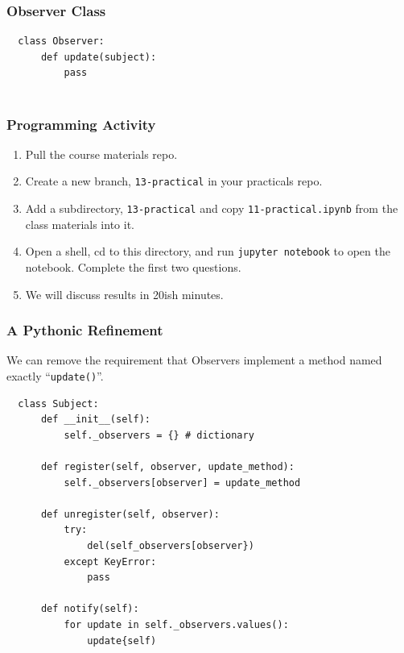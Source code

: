 \documentclass[10pt]{beamer}
\begin{document}
\begin{frame}[fragile]
  \frametitle{Observer Class}

  \begin{verbatim}
  class Observer:
      def update(subject):
          pass
      
  \end{verbatim}
 \end{frame} 


\begin{frame}
  \frametitle{Programming Activity}
  
  \begin{enumerate}
    \item Pull the course materials repo.
    \item Create a new branch, \texttt{13-practical} in your practicals repo.
    \item Add a subdirectory,  \texttt{13-practical} and copy \texttt{11-practical.ipynb} from the class materials into it.
    \item Open a shell, cd to this directory, and run \texttt{jupyter notebook} to open the notebook. Complete the first two questions.
    \item We will discuss results in 20ish minutes.
  \end{enumerate}      
\end{frame}

\begin{frame}[fragile]
  \frametitle{A Pythonic Refinement}
  
  We can remove the requirement that Observers implement a method
  named exactly ``\texttt{update()}''.
  
  \begin{verbatim}
  class Subject:  
      def __init__(self):
          self._observers = {} # dictionary
          
      def register(self, observer, update_method):
          self._observers[observer] = update_method
          
      def unregister(self, observer):
          try:    
              del(self_observers[observer})
          except KeyError:
              pass
              
      def notify(self):
          for update in self._observers.values():
              update{self)
                      
  \end{verbatim} 
       
\end{frame} 
\end{document}
